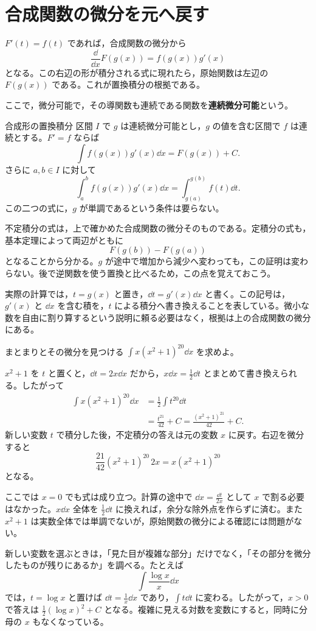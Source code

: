 \section{合成関数の微分を元へ戻す}\label{節:合成形の置換}

$F'(t)=f(t)$ であれば，合成関数の微分から
\[
 \frac{\dd}{\dd x}F(g(x))=f(g(x))g'(x)
\]
となる。この右辺の形が積分される式に現れたら，原始関数は左辺の $F(g(x))$ である。これが置換積分の根拠である。

ここで，微分可能で，その導関数も連続である関数を\textbf{連続微分可能}という。\label{用語:連続微分可能}

\begin{theorem}{合成形の置換積分}
区間 $I$ で $g$ は連続微分可能とし，$g$ の値を含む区間で $f$ は連続とする。$F'=f$ ならば
\[
 \int f(g(x))g'(x)\dd x=F(g(x))+C.
\]
さらに $a,b\in I$ に対して
\[
 \int_a^b f(g(x))g'(x)\dd x
 =\int_{g(a)}^{g(b)}f(t)\dd t.
\]
この二つの式に，$g$ が単調であるという条件は要らない。
\end{theorem}

不定積分の式は，上で確かめた合成関数の微分そのものである。定積分の式も，基本定理によって両辺がともに
\[
 F(g(b))-F(g(a))
\]
となることから分かる。$g$ が途中で増加から減少へ変わっても，この証明は変わらない。後で逆関数を使う置換と比べるため，この点を覚えておこう。

実際の計算では，$t=g(x)$ と置き，$\dd t=g'(x)\dd x$ と書く。この記号は，$g'(x)$ と $\dd x$ を含む積を，$t$ による積分へ書き換えることを表している。微小な数を自由に割り算するという説明に頼る必要はなく，根拠は上の合成関数の微分にある。

\begin{example}{まとまりとその微分を見つける}
$\int x(x^2+1)^{20}\dd x$ を求めよ。
\end{example}

$x^2+1$ を $t$ と置くと，$\dd t=2x\dd x$ だから，$x\dd x=\frac12\dd t$ とまとめて書き換えられる。したがって
\[
\begin{aligned}
 \int x(x^2+1)^{20}\dd x
 &=\frac12\int t^{20}\dd t\\
 &=\frac{t^{21}}{42}+C
 =\frac{(x^2+1)^{21}}{42}+C.
\end{aligned}
\]
新しい変数 $t$ で積分した後，不定積分の答えは元の変数 $x$ に戻す。右辺を微分すると
\[
 \frac{21}{42}(x^2+1)^{20}\,2x
 =x(x^2+1)^{20}
\]
となる。

ここでは $x=0$ でも式は成り立つ。計算の途中で $\dd x=\frac{\dd t}{2x}$ として $x$ で割る必要はなかった。$x\dd x$ 全体を $\frac12\dd t$ に換えれば，余分な除外点を作らずに済む。また $x^2+1$ は実数全体では単調でないが，原始関数の微分による確認には問題がない。

新しい変数を選ぶときは，「見た目が複雑な部分」だけでなく，「その部分を微分したものが残りにあるか」を調べる。たとえば
\[
 \int\frac{\log x}{x}\dd x
\]
では，$t=\log x$ と置けば $\dd t=\frac1x\dd x$ であり，$\int t\dd t$ に変わる。したがって，$x>0$ で答えは $\frac12(\log x)^2+C$ となる。複雑に見える対数を変数にすると，同時に分母の $x$ もなくなっている。

